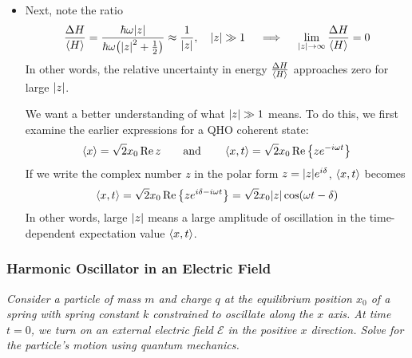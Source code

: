 \documentclass[11pt, a4paper]{article}
\newcommand{\eqtext}[1]{\qquad \text{#1} \qquad}
\begin{document}
\begin{itemize}
	\item Next, note the ratio
	\begin{equation*}
		\frac{\Delta H}{\ev{H}} = \frac{\hbar \omega \abs{z}}{\hbar \omega \big(\abs{z}^{2} + \tfrac{1}{2}\big)} \approx \frac{1}{\abs{z}}, \quad \abs{z} \gg 1 \quad \implies \quad \lim_{\abs{z} \to \infty} \frac{\Delta H}{\ev{H}} = 0
	\end{equation*}
	In other words, the relative uncertainty in energy $ \frac{\Delta H}{\ev{H}} $ approaches zero for large $ \abs{z} $. 
	
	We want a better understanding of what  $ \abs{z} \gg 1 $ means. To do this, we first examine the earlier expressions for a QHO coherent state:
	\begin{equation*}
		\ev{x} = \sqrt{2}x_{0}\Re z \eqtext{and} \ev{x, t} = \sqrt{2}x_{0}\Re \left\{ze^{-i\omega t}\right\}
	\end{equation*}
	If we write the complex number $ z $ in the polar form $ z = \abs{z}e^{i\delta} $, $ \ev{x, t}  $ becomes
	\begin{equation*}
		\ev{x, t}  =  \sqrt{2}x_{0}\Re \left\{ze^{i\delta -i\omega t}\right\} = \sqrt{2}x_{0}\abs{z}\cos(\omega t - \delta  )
	\end{equation*}
	In other words, large $ \abs{z} $ means a large amplitude of oscillation in the time-dependent expectation value $ \ev{x, t} $. 
	
\end{itemize}

\subsubsection{Harmonic Oscillator in an Electric Field}
\textit{Consider a particle of mass $ m $ and charge $ q $ at the equilibrium position $ x_{0} $ of a spring with spring constant $ k $ constrained to oscillate along the $ x $ axis. At time $ t = 0 $, we turn on an external electric field $ \mathcal{E} $ in the positive $ x $ direction. Solve for the particle's motion using quantum mechanics. }
\end{document}
